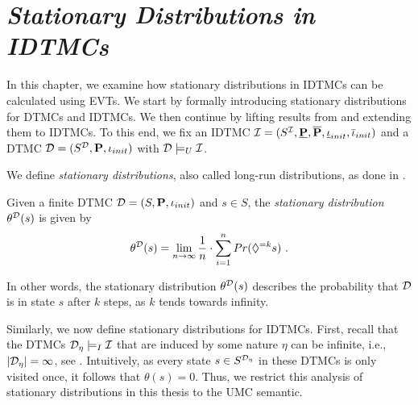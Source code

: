 \chapter{\textit{Stationary Distributions in IDTMCs}}
\label{ch:BSCCs_in_IDTMCs}

In this chapter, we examine how stationary distributions in IDTMCs can be calculated using EVTs. We start by formally introducing stationary distributions for DTMCs and IDTMCs. We then continue by lifting results from \cite{modeling_and_analysis_stochastic_systems,Computing_EVTs_Stationary_Distr_in_MCs_Mertens} and extending them to IDTMCs. To this end, we fix an IDTMC $\mathcal{I} = (S^{\mathcal{I}},\mathbf{\underline{P}},\mathbf{\overline{P}},\mathbf{\underline{\iota}}_{init},\mathbf{\overline{\iota}}_{init})$ and a DTMC $\mathcal{D} = (S^{\mathcal{D}},\mathbf{P},\iota_{init})$ with $\mathcal{D} \models_U \mathcal{I}$.

We define \textit{stationary distributions}, also called long-run distributions, as done in \cite{Bibel}.
\begin{definition}
    Given a finite DTMC $\mathcal{D} = (S,\mathbf{P},\iota_{init})$ and $s\in S$, the \textit{stationary distribution} $\theta^{\mathcal{D}}(s)$ is given by
    \[ \theta^{\mathcal{D}}(s) = \lim_{n\rightarrow \infty} \frac{1}{n} \cdot \sum_{i=1}^{n}Pr(\lozenge^{=k}s)\ .\]
\end{definition}
In other words, the stationary distribution $\theta^{\mathcal{D}}(s)$ describes the probability that $\mathcal{D}$ is in state $s$ after $k$ steps, as $k$ tends towards infinity. 

Similarly, we now define stationary distributions for IDTMCs. First, recall that the DTMCs $\mathcal{D}_{\eta} \models_I \mathcal{I}$ that are induced by some nature $\eta$ can be infinite, i.e., $|\mathcal{D}_{\eta}| = \infty$, see . Intuitively, as every state $s\in S^{\mathcal{D}_{\eta}}$ in these DTMCs is only visited once, it follows that $\theta(s) = 0$. 
Thus, we restrict this analysis of stationary distributions in this thesis to the UMC semantic.

